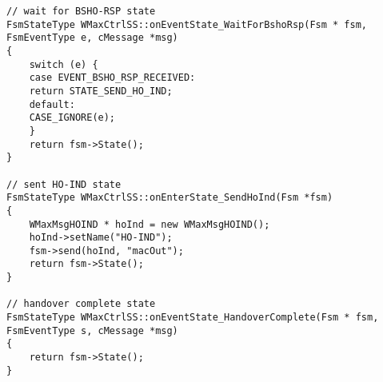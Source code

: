 \begin{lstlisting}
// wait for BSHO-RSP state
FsmStateType WMaxCtrlSS::onEventState_WaitForBshoRsp(Fsm * fsm, FsmEventType e, cMessage *msg)
{
    switch (e) {
    case EVENT_BSHO_RSP_RECEIVED:
	return STATE_SEND_HO_IND;
    default:
	CASE_IGNORE(e);
    }
    return fsm->State();
}

// sent HO-IND state
FsmStateType WMaxCtrlSS::onEnterState_SendHoInd(Fsm *fsm)
{
    WMaxMsgHOIND * hoInd = new WMaxMsgHOIND();
    hoInd->setName("HO-IND");
    fsm->send(hoInd, "macOut");
    return fsm->State();
}
    
// handover complete state
FsmStateType WMaxCtrlSS::onEventState_HandoverComplete(Fsm * fsm, FsmEventType s, cMessage *msg)
{
    return fsm->State();
}

\end{lstlisting}

